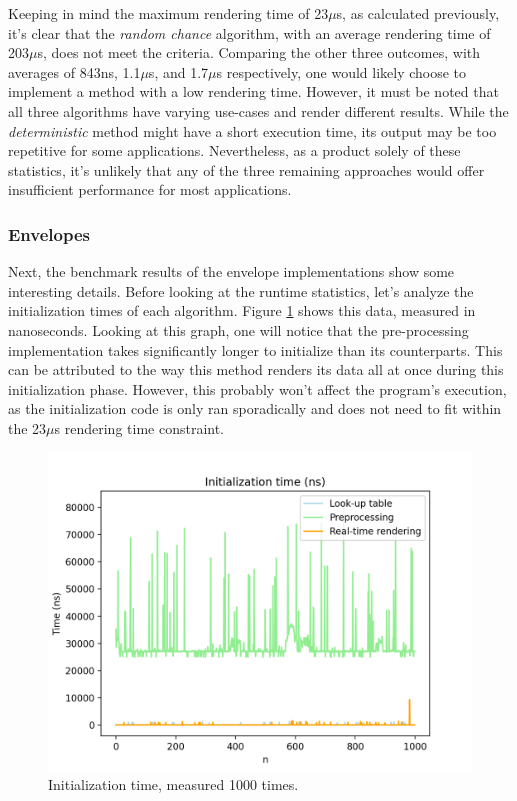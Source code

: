 \documentclass[10pt, twocolumn]{IEEEtran}
\begin{document}
Keeping in mind the maximum rendering time of 23$\mu$s, as calculated previously, it's clear that the \textit{random chance} algorithm, with an average rendering time of 203$\mu$s, does not meet the criteria. Comparing the other three outcomes, with averages of 843ns, 1.1$\mu$s, and 1.7$\mu$s respectively, one would likely choose to implement a method with a low rendering time. However, it must be noted that all three algorithms have varying use-cases and render different results. While the \textit{deterministic} method might have a short execution time, its output may be too repetitive for some applications. Nevertheless, as a product solely of these statistics, it's unlikely that any of the three remaining approaches would offer insufficient performance for most applications.\\

\subsubsection{Envelopes}
Next, the benchmark results of the envelope implementations show some interesting details. Before looking at the runtime statistics, let's analyze the initialization times of each algorithm. Figure \ref{fig:env_init_time} shows this data, measured in nanoseconds. Looking at this graph, one will notice that the pre-processing implementation takes significantly longer to initialize than its counterparts. This can be attributed to the way this method renders its data all at once during this initialization phase. However, this probably won't affect the program's execution, as the initialization code is only ran sporadically and does not need to fit within the 23$\mu$s rendering time constraint.\pagebreak
\begin{figure}[ht!]
	\includegraphics[width=\linewidth]{env_init_time.png}
	\caption{Initialization time, measured 1000 times.}
	\label{fig:env_init_time}
\end{figure}
\end{document}
